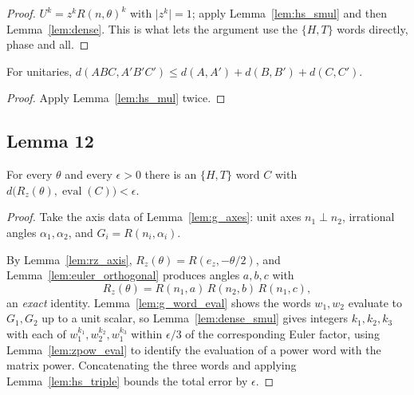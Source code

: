 \begin{proof}
  \leanok
  $U^k = z^k R(n,\theta)^k$ with $\lvert z^k\rvert = 1$; apply
  Lemma~\ref{lem:hs_smul} and then Lemma~\ref{lem:dense}.  This is what lets
  the argument use the $\{H,T\}$ words directly, phase and all.
\end{proof}

\begin{lemma}
  \label{lem:hs_triple}
  \leanok
  For unitaries, $d(ABC, A'B'C') \le d(A,A') + d(B,B') + d(C,C')$.
\end{lemma}

\begin{proof}
  \leanok
  Apply Lemma~\ref{lem:hs_mul} twice.
\end{proof}

\subsection{Lemma 12}

\begin{theorem}
  \label{thm:lemma12_core}
  \leanok
  For every $\theta$ and every $\epsilon > 0$ there is an $\{H,T\}$ word $C$
  with $d\big(R_z(\theta), \operatorname{eval}(C)\big) < \epsilon$.
\end{theorem}

\begin{proof}
  \leanok
  Take the axis data of Lemma~\ref{lem:g_axes}: unit axes $n_1 \perp n_2$,
  irrational angles $\alpha_1, \alpha_2$, and $G_i = R(n_i,\alpha_i)$.

  By Lemma~\ref{lem:rz_axis}, $R_z(\theta) = R(e_z, -\theta/2)$, and
  Lemma~\ref{lem:euler_orthogonal} produces angles $a,b,c$ with
  \[
    R_z(\theta) = R(n_1,a)\,R(n_2,b)\,R(n_1,c),
  \]
  an \emph{exact} identity.  Lemma~\ref{lem:g_word_eval} shows the words $w_1,
  w_2$ evaluate to $G_1, G_2$ up to a unit scalar, so
  Lemma~\ref{lem:dense_smul} gives integers $k_1,k_2,k_3$ with each of
  $w_1^{k_1}, w_2^{k_2}, w_1^{k_3}$ within $\epsilon/3$ of the corresponding
  Euler factor, using Lemma~\ref{lem:zpow_eval} to identify the evaluation of a
  power word with the matrix power.  Concatenating the three words and applying
  Lemma~\ref{lem:hs_triple} bounds the total error by $\epsilon$.
\end{proof}

